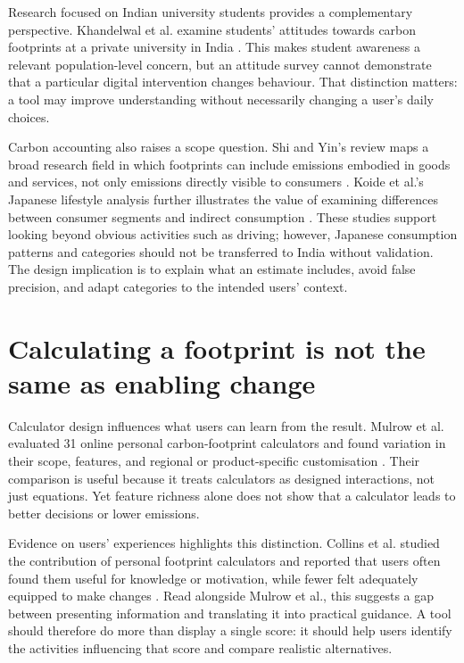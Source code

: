 \documentclass[10pt,a4paper,twocolumn]{article}
\begin{document}
Research focused on Indian university students provides a complementary perspective. Khandelwal et al. examine students' attitudes towards carbon footprints at a private university in India \cite{khandelwal2019}. This makes student awareness a relevant population-level concern, but an attitude survey cannot demonstrate that a particular digital intervention changes behaviour. That distinction matters: a tool may improve understanding without necessarily changing a user's daily choices.

Carbon accounting also raises a scope question. Shi and Yin's review maps a broad research field in which footprints can include emissions embodied in goods and services, not only emissions directly visible to consumers \cite{shi2021}. Koide et al.'s Japanese lifestyle analysis further illustrates the value of examining differences between consumer segments and indirect consumption \cite{koide2019}. These studies support looking beyond obvious activities such as driving; however, Japanese consumption patterns and categories should not be transferred to India without validation. The design implication is to explain what an estimate includes, avoid false precision, and adapt categories to the intended users' context.

\section{Calculating a footprint is not the same as enabling change}
Calculator design influences what users can learn from the result. Mulrow et al. evaluated 31 online personal carbon-footprint calculators and found variation in their scope, features, and regional or product-specific customisation \cite{mulrow2019}. Their comparison is useful because it treats calculators as designed interactions, not just equations. Yet feature richness alone does not show that a calculator leads to better decisions or lower emissions.

Evidence on users' experiences highlights this distinction. Collins et al. studied the contribution of personal footprint calculators and reported that users often found them useful for knowledge or motivation, while fewer felt adequately equipped to make changes \cite{collins2020}. Read alongside Mulrow et al., this suggests a gap between presenting information and translating it into practical guidance. A tool should therefore do more than display a single score: it should help users identify the activities influencing that score and compare realistic alternatives.
\end{document}
